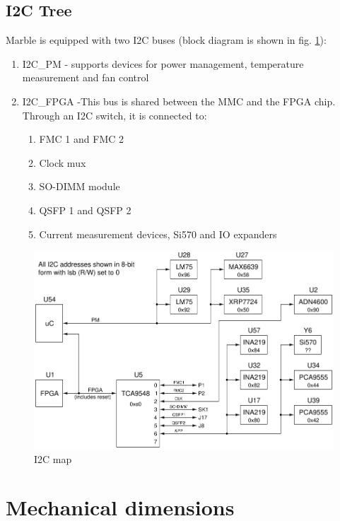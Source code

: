 \documentclass[12pt,oneside,a4]{article}
\begin{document}
\subsection{I2C Tree}
Marble is equipped with two I2C buses (block diagram is shown in fig. \ref{i2c}):
\begin{enumerate}
	\item I2C\_PM - supports devices for power management, temperature measurement and fan control
	\item I2C\_FPGA -This bus is shared between the MMC and the FPGA chip. Through an I2C switch, it is connected to:
	\begin{enumerate}
		\item FMC 1 and FMC 2
		\item Clock mux
		\item SO-DIMM module
		\item QSFP 1 and QSFP 2
		\item Current measurement devices, Si570 and IO expanders
	\end{enumerate}
\end{enumerate}
\begin{figure}[H]
\begin{center}
\includegraphics[width=1\linewidth]{marble2_i2c.png}
 \caption{I2C map}\label{i2c}
\end{center}
\end{figure}

\section{Mechanical dimensions}
\end{document}
